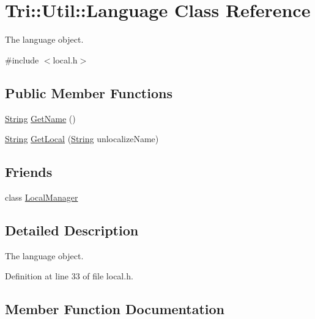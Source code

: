 \hypertarget{class_tri_1_1_util_1_1_language}{}\section{Tri\+:\+:Util\+:\+:Language Class Reference}
\label{class_tri_1_1_util_1_1_language}


The language object.  




{\ttfamily \#include $<$local.\+h$>$}

\subsection*{Public Member Functions}
\begin{DoxyCompactItemize}
\item 
\hyperlink{namespace_tri_1_1_util_af46507fc04f64a834bf12b8fdf4dde37}{String} \hyperlink{class_tri_1_1_util_1_1_language_a66e5e8c4f356e8e96ded61d07fd2c873}{Get\+Name} ()
\item 
\hyperlink{namespace_tri_1_1_util_af46507fc04f64a834bf12b8fdf4dde37}{String} \hyperlink{class_tri_1_1_util_1_1_language_a600603b654febb9f5978f55725239f74}{Get\+Local} (\hyperlink{namespace_tri_1_1_util_af46507fc04f64a834bf12b8fdf4dde37}{String} unlocalize\+Name)
\end{DoxyCompactItemize}
\subsection*{Friends}
\begin{DoxyCompactItemize}
\item 
class \hyperlink{class_tri_1_1_util_1_1_language_af7a1efe82e3beafa2fa9fc62c5ce5837}{Local\+Manager}
\end{DoxyCompactItemize}


\subsection{Detailed Description}
The language object. 

Definition at line 33 of file local.\+h.



\subsection{Member Function Documentation}
\hypertarget{class_tri_1_1_util_1_1_language_a600603b654febb9f5978f55725239f74}{}
